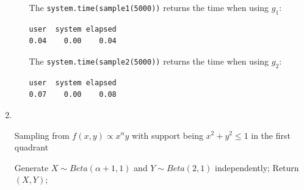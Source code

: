 \documentclass{article}
\begin{document}
\begin{enumerate}[leftmargin = 0 em, label = \arabic*., font = \bfseries]
\begin{enumerate}
		The \verb|system.time(sample1(5000))| returns the time when using $g_1$:
		\begin{verbatim}
user  system elapsed 
0.04    0.00    0.04 
		\end{verbatim}

		The \verb|system.time(sample2(5000))| returns the time when using $g_2$:
		\begin{verbatim}
user  system elapsed 
0.07    0.00    0.08 
		\end{verbatim}
	\end{enumerate}
	
	\item 

	\

	\begin{algorithm}
		\caption{Sampling from $f(x,y) \propto x^{\alpha}y$ with support being $x^2 + y^2 \leq 1$ in the first quadrant}
		\begin{algorithmic}[1]
			\State  Generate $X \sim Beta(\alpha + 1, 1)$ and $Y \sim Beta(2,1)$ independently;
			  \Else \Statex Return $(X,Y)$;\EndIf
		\end{algorithmic}
	\end{algorithm}
	

 	\end{enumerate}



	
\end{document}
